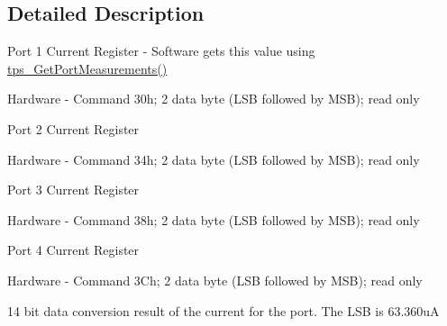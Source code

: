 \subsection{Detailed Description}
Port 1 Current Register -\/ Software gets this value using \hyperlink{_t_p_s23861_8c_aea33e295bb735809ad2edf78ed8b2543}{tps\-\_\-\-Get\-Port\-Measurements()} \par
 Hardware -\/ Command 30h; 2 data byte (L\-S\-B followed by M\-S\-B); read only \par
 Port 2 Current Register \par
 Hardware -\/ Command 34h; 2 data byte (L\-S\-B followed by M\-S\-B); read only \par
 Port 3 Current Register \par
 Hardware -\/ Command 38h; 2 data byte (L\-S\-B followed by M\-S\-B); read only \par
 Port 4 Current Register \par
 Hardware -\/ Command 3\-Ch; 2 data byte (L\-S\-B followed by M\-S\-B); read only \par
\par
 14 bit data conversion result of the current for the port. The L\-S\-B is 63.\-360u\-A 

